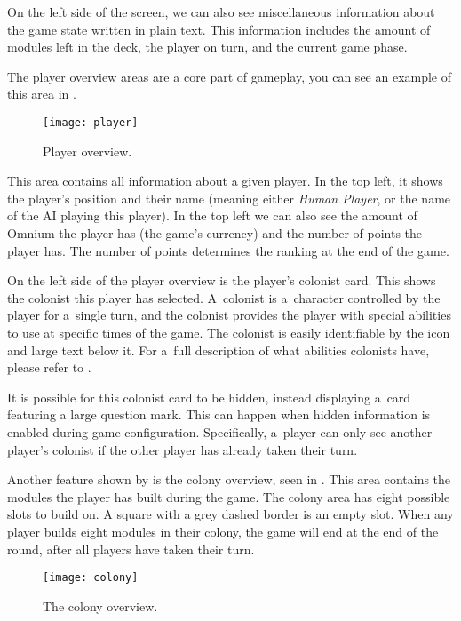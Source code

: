On the left side of the screen, we can also see miscellaneous information about the
game state written in plain text. This information includes the amount of modules
left in the deck, the player on turn, and the current game phase.

The player overview areas are a core part of gameplay, you can see an example
of this area in .

\begin{figure}[ht]
\centerline{\mbox{\texttt{[image: player]}}}
\caption{Player overview.}\label{ud:player}
\end{figure}

This area contains all information about a given player. In the top left,
it shows the player's position and their name (meaning either \emph{Human Player},
or the name of the AI playing this player). In the top left we can also see
the amount of Omnium the player has (the game's currency) and the number of points
the player has. The number of points determines the ranking at the end of the game.

On the left side of the player overview is the player's colonist card. This shows
the colonist this player has selected. A~colonist is a~character controlled
by the player for a~single turn, and the colonist provides the player with
special abilities to use at specific times of the game. The colonist is
easily identifiable by the icon and large text below it. For a~full description
of what abilities colonists have, please refer to .

It is possible for this colonist card to be hidden, instead displaying a~card
featuring a large question mark. This can happen when hidden information is enabled
during game configuration. Specifically, a~player can only see another player's
colonist if the other player has already taken their turn.

Another feature shown by  is the colony overview, seen in
. This area contains the modules the player has built during
the game. The colony area has eight possible slots to build on. A square with
a grey dashed border is an empty slot. When any player
builds eight modules in their colony, the game will end at the end of the round,
after all players have taken their turn.

\begin{figure}[ht]
\centerline{\mbox{\texttt{[image: colony]}}}
\caption{The colony overview.}\label{ud:colony}
\end{figure}

